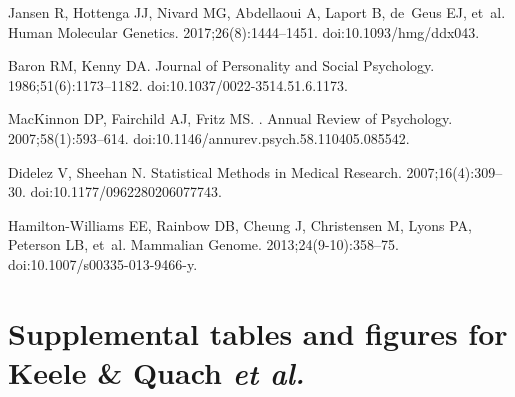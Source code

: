 \documentclass[10pt,letterpaper,twoside]{article}
\begin{document}
\newpage

\begin{thebibliography}{10}

Jansen R, Hottenga JJ, Nivard MG, Abdellaoui A, Laport B, de~Geus EJ, et~al.
\newblock Human Molecular Genetics. 2017;26(8):1444--1451.
\newblock doi:{10.1093/hmg/ddx043}.

Baron RM, Kenny DA.
\newblock Journal of Personality and Social Psychology. 1986;51(6):1173--1182.
\newblock doi:{10.1037/0022-3514.51.6.1173}.

MacKinnon DP, Fairchild AJ, Fritz MS.
.
\newblock Annual Review of Psychology. 2007;58(1):593--614.
\newblock doi:{10.1146/annurev.psych.58.110405.085542}.

Didelez V, Sheehan N.
\newblock Statistical Methods in Medical Research. 2007;16(4):309--30.
\newblock doi:{10.1177/0962280206077743}.

Hamilton-Williams EE, Rainbow DB, Cheung J, Christensen M, Lyons PA, Peterson
  LB, et~al.
\newblock Mammalian Genome. 2013;24(9-10):358--75.
\newblock doi:{10.1007/s00335-013-9466-y}.

\end{thebibliography}

\newpage

\setcounter{page}{1}

\section*{Supplemental tables and figures for Keele \& Quach \textit{et al.}}

\setcounter{table}{0}
\setcounter{figure}{0}
\renewcommand{\thetable}{S\arabic{table}}
\renewcommand{\thefigure}{S\arabic{figure}}
\setcounter{page}{1}
\end{document}
